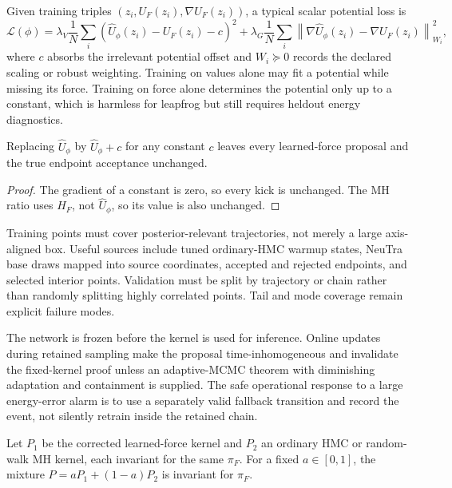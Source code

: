 Given training triples $(z_i,U_F(z_i),\nabla U_F(z_i))$, a typical scalar
potential loss is
\begin{equation}
 \mathcal L(\phi)
 =\lambda_V\frac1N\sum_i
   \left(\widehat U_\phi(z_i)-U_F(z_i)-c\right)^2
 +\lambda_G\frac1N\sum_i
   \left\|\nabla\widehat U_\phi(z_i)-\nabla U_F(z_i)\right\|_{W_i}^2,
 \label{eq:bf-hnn-training-loss}
\end{equation}
where $c$ absorbs the irrelevant potential offset and $W_i\succeq0$ records
the declared scaling or robust weighting.  Training on values alone may fit a
potential while missing its force.  Training on force alone determines the
potential only up to a constant, which is harmless for leapfrog but still
requires heldout energy diagnostics.

\begin{proposition}
\label{prop:bf-hnn-offset}
Replacing $\widehat U_\phi$ by $\widehat U_\phi+c$ for any constant $c$ leaves
every learned-force proposal and the true endpoint acceptance unchanged.
\end{proposition}

\begin{proof}
The gradient of a constant is zero, so every kick is unchanged.  The MH ratio
uses $H_F$, not $\widehat U_\phi$, so its value is also unchanged.
\end{proof}

Training points must cover posterior-relevant trajectories, not merely a large
axis-aligned box.  Useful sources include tuned ordinary-HMC warmup states,
NeuTra base draws mapped into source coordinates, accepted and rejected
endpoints, and selected interior points.  Validation must be split by
trajectory or chain rather than randomly splitting highly correlated points.
Tail and mode coverage remain explicit failure modes.

The network is frozen before the kernel is used for inference.  Online updates
during retained sampling make the proposal time-inhomogeneous and invalidate
the fixed-kernel proof unless an adaptive-MCMC theorem with diminishing
adaptation and containment is supplied.  The safe operational response to a
large energy-error alarm is to use a separately valid fallback transition and
record the event, not silently retrain inside the retained chain.

\begin{proposition}
\label{prop:bf-hnn-mixture-kernels}
Let $P_1$ be the corrected learned-force kernel and $P_2$ an ordinary HMC or
random-walk MH kernel, each invariant for the same $\pi_F$.  For a fixed
$a\in[0,1]$, the mixture $P=aP_1+(1-a)P_2$ is invariant for $\pi_F$.
\end{proposition}

